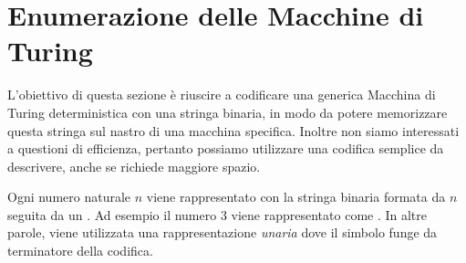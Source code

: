 \section{Enumerazione delle Macchine di Turing}

L'obiettivo di questa sezione è riuscire a codificare una generica Macchina di Turing deterministica con una stringa binaria, in modo
da potere memorizzare questa stringa sul nastro di una macchina specifica.
Inoltre non siamo interessati a questioni di efficienza, pertanto possiamo utilizzare una codifica semplice da
descrivere, anche se richiede maggiore spazio.

Ogni numero naturale $n$ viene rappresentato con la stringa binaria formata da $n$ \zero seguita da un \uno.
Ad esempio il numero $3$ viene rappresentato come \zero\zero\zero\uno.
In altre parole, viene utilizzata una rappresentazione \emph{unaria} dove il simbolo \uno funge da terminatore della codifica.





